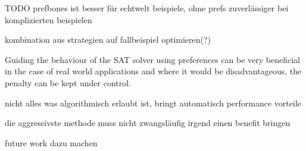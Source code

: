 TODO prefbones ist besser für echtwelt beispiele, ohne prefs zuverlässiger bei komplizierten beispielen

kombination aus strategien auf fallbeispiel optimieren(?)

Guiding the behaviour of the SAT solver using preferences can be very beneficial in the case of real world applications and where it would be disadvantageous, the penalty can be kept under control. 

nicht alles was algorithmisch erlaubt ist, bringt automatisch performance vorteile

die aggressivste methode muss nicht zwangsläufig irgend einen benefit bringen

future work dazu machen


